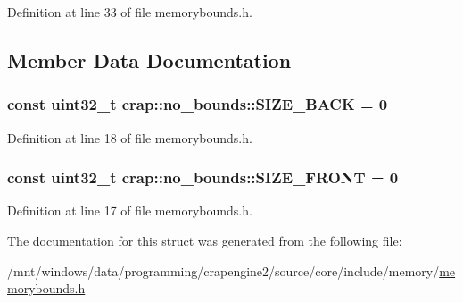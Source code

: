 Definition at line 33 of file memorybounds.\+h.



\subsection{Member Data Documentation}
\hypertarget{structcrap_1_1no__bounds_af9c6959f51073f04ba5a9c7afd1ae5a6}{}
\subsubsection[{S\+I\+Z\+E\+\_\+\+B\+A\+C\+K}]{\setlength{\rightskip}{0pt plus 5cm}const uint32\+\_\+t crap\+::no\+\_\+bounds\+::\+S\+I\+Z\+E\+\_\+\+B\+A\+C\+K = 0\hspace{0.3cm}{\ttfamily [static]}}\label{structcrap_1_1no__bounds_af9c6959f51073f04ba5a9c7afd1ae5a6}


Definition at line 18 of file memorybounds.\+h.

\hypertarget{structcrap_1_1no__bounds_a54eb57eb2eb31dfe9a285d5dcc3663e0}{}
\subsubsection[{S\+I\+Z\+E\+\_\+\+F\+R\+O\+N\+T}]{\setlength{\rightskip}{0pt plus 5cm}const uint32\+\_\+t crap\+::no\+\_\+bounds\+::\+S\+I\+Z\+E\+\_\+\+F\+R\+O\+N\+T = 0\hspace{0.3cm}{\ttfamily [static]}}\label{structcrap_1_1no__bounds_a54eb57eb2eb31dfe9a285d5dcc3663e0}


Definition at line 17 of file memorybounds.\+h.



The documentation for this struct was generated from the following file\+:\begin{DoxyCompactItemize}
\item 
/mnt/windows/data/programming/crapengine2/source/core/include/memory/\hyperlink{memorybounds_8h}{memorybounds.\+h}\end{DoxyCompactItemize}
